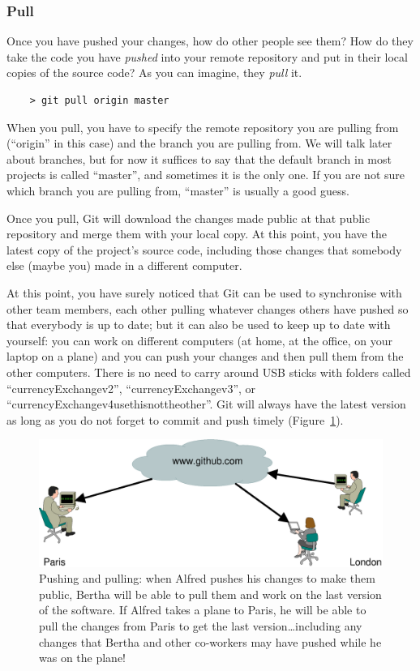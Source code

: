 \subsubsection{Pull}
\label{sec:pull}

Once you have pushed your changes, how do other people see them? How
do they take the code you have \emph{pushed} into your remote
repository and put in their local copies of the source code? As you
can imagine, they \emph{pull} it. 

\begin{verbatim}
    > git pull origin master
\end{verbatim}

When you pull, you have to specify the remote repository you are
pulling from (``origin'' in this case) and the branch you are pulling
from. We will talk later about branches, but for now it suffices to
say that the default branch in most projects is called ``master'', and
sometimes it is the only one. If you are not sure which branch you are
pulling from, ``master'' is usually a good guess.

Once you pull, Git will download the changes made public at that
public repository and merge them with your local copy. At this point,
you have the latest copy of the project's source code, including those
changes that somebody else (maybe you) made in a different computer. 

At this point, you have surely noticed that Git can be used to
synchronise with other team members, each other pulling whatever
changes others have pushed so that everybody is up to date; but it can
also be used to keep up to date with yourself: you can work on
different computers (at home, at the office, on your laptop on a
plane) and you can push your changes and then pull them from the other
computers. There is no need to carry around USB sticks with folders
called ``currencyExchangev2'', ``currencyExchangev3'', or
``currencyExchangev4usethisnottheother''. Git will always have the
latest version as long as you do not forget to commit and push
timely (Figure~\ref{fig:pushpull}). 

\begin{figure}[htbp!]
  \centering
  \includegraphics[width=\textwidth]{gfx/pushpull}
  \caption{Pushing and pulling: when Alfred pushes his changes to make
    them public, Bertha will be able to pull them and work on the last
    version of the software. If Alfred takes a plane to Paris, he will
    be able to pull the changes from Paris to get the last
    version\ldots including any changes that Bertha and other
    co-workers may have pushed while he was on the plane!}
  \label{fig:pushpull}
\end{figure}

